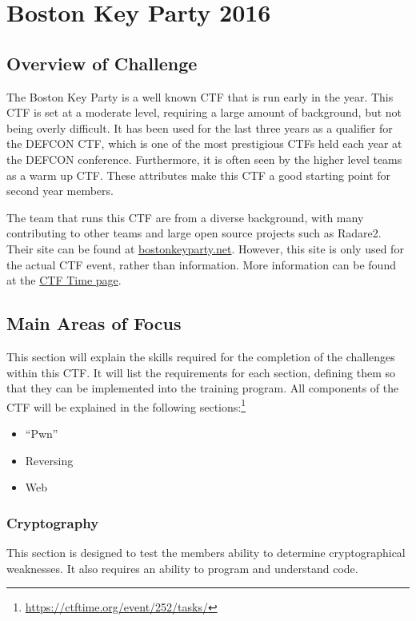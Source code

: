 \documentclass[a4paper,11pt]{report}
\begin{document}
\chapter{Boston Key Party 2016}
	\section{Overview of Challenge}
		The Boston Key Party is a well known CTF that is run early in the year. 
		This CTF is set at a moderate level, requiring a large amount of background, but not being overly difficult. 
		It has been used for the last three years as a qualifier for the DEFCON CTF, 
		which is one of the most prestigious CTFs held each year at the DEFCON conference. 
		Furthermore, it is often seen by the higher level teams as a warm up CTF. 
		These attributes make this CTF a good starting point for second year members. 

		The team that runs this CTF are from a diverse background, with many contributing to other teams and large open source projects such as Radare2.
		Their site can be found at \href{https://web.archive.org/web/20160131055956/http://bostonkeyparty.net/}{bostonkeyparty.net}. 
		However, this site is only used for the actual CTF event, rather than information. 
		More information can be found at the \href{https://ctftime.org/event/252}{CTF Time page}.
	\section{Main Areas of Focus}
		This section will explain the skills required for the completion of the challenges within this CTF. 
		It will list the requirements for each section, defining them so that they can be implemented into the training program. 
		All components of the CTF will be explained in the following sections:\footnote{\url{https://ctftime.org/event/252/tasks/}}
		\begin{itemize}
			\item ``Pwn''
			\item Reversing
			\item Web
		\end{itemize}
		\subsection{Cryptography}
			This section is designed to test the members ability to determine cryptographical weaknesses. 
			It also requires an ability to program and understand code. 
			
\end{document}
